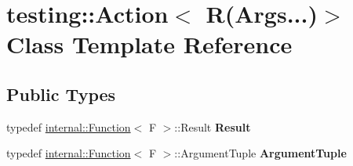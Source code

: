 \hypertarget{classtesting_1_1Action_3_01R_07Args_8_8_8_08_4}{}\section{testing\+:\+:Action$<$ R(Args...)$>$ Class Template Reference}
\label{classtesting_1_1Action_3_01R_07Args_8_8_8_08_4}
\subsection*{Public Types}
\begin{DoxyCompactItemize}
\item 
\mbox{\label{classtesting_1_1Action_3_01R_07Args_8_8_8_08_4_aa6848fedb346ec3e57cc6055ca8a0a99}} 
typedef \mbox{\hyperlink{structtesting_1_1internal_1_1Function}{internal\+::\+Function}}$<$ F $>$\+::Result {\bfseries Result}
\item 
\mbox{\label{classtesting_1_1Action_3_01R_07Args_8_8_8_08_4_a977a25b13d80a869ae7aa738e3bba83e}} 
typedef \mbox{\hyperlink{structtesting_1_1internal_1_1Function}{internal\+::\+Function}}$<$ F $>$\+::Argument\+Tuple {\bfseries Argument\+Tuple}
\end{DoxyCompactItemize}
